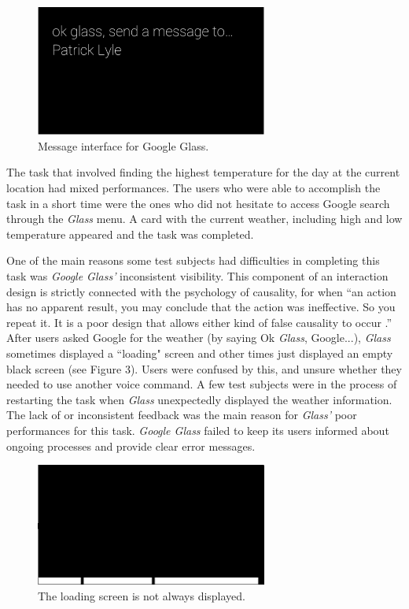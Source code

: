 \documentclass[11pt,a4paper]{scrartcl}
\begin{document}
\begin{figure}[h]
\centering
\includegraphics[width=3in]{glass_message.png}
\caption{Message interface for Google Glass.}
\end{figure}

The task that involved finding the highest temperature for the day at the current location had mixed performances. The users who were able to accomplish the task in a short time were the ones who did not hesitate to access Google search through the \textit{Glass} menu. A card with the current weather, including high and low temperature appeared and the task was completed. 

One of the main reasons some test subjects had difficulties in completing this task was \textit{Google Glass'} inconsistent visibility. This component of an interaction design is strictly connected with the psychology of causality, for when ``an action has no apparent result, you may conclude that the action was ineffective. So you repeat it. It is a poor design that allows either kind of false causality to occur \cite{norman02}.'' After users asked Google for the weather (by saying Ok \textit{Glass}, Google...), \textit{Glass} sometimes displayed a ``loading" screen and other times just displayed an empty black screen (see Figure 3). Users were confused by this, and unsure whether they needed to use another voice command. A few test subjects were in the process of restarting the task when \textit{Glass} unexpectedly displayed the weather information. The lack of or inconsistent feedback was the main reason for \textit{Glass'} poor performances for this task. \textit{Google Glass} failed to keep its users informed about ongoing processes and  provide clear error messages. 

\begin{figure}[h]
\centering
\includegraphics[width=3in]{glass_loading.png}
\caption{The loading screen is not always displayed.}
\end{figure}
\end{document}
